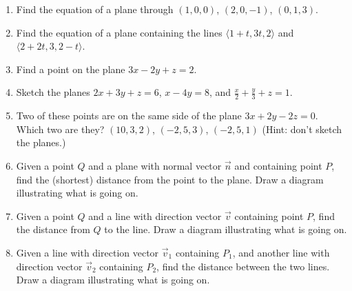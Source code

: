\documentclass[12pt]{article}
\begin{document}
\begin{enumerate}
\item Find the equation of a plane through $(1,0,0)$, $(2,0,-1)$, $(0,1,3)$.
\item Find the equation of a plane containing the lines $\langle 1+t, 3t, 2\rangle$ and $\langle 2+2t, 3, 2-t\rangle$.
\item Find a point on the plane $3x-2y+z=2$.
\item Sketch the planes $2x+3y+z=6$, $x-4y=8$, and $\frac{x}{2}+\frac{y}{3}+z=1$.
\item Two of these points are on the same side of the plane $3x+2y-2z=0$.  Which two are they?  $(10,3,2)$, $(-2,5,3)$, $(-2,5,1)$ (Hint: don't sketch the planes.)
\item Given a point $Q$ and a plane with normal vector $\vec n$ and containing point $P$, find the (shortest) distance from the point to the plane.  Draw a diagram illustrating what is going on.
\item Given a point $Q$ and a line with direction vector $\vec v$ containing point $P$, find the distance from $Q$ to the line.  Draw a diagram illustrating what is going on.
\item Given a line with direction vector $\vec v_1$ containing $P_1$, and another line with direction vector $\vec v_2$ containing $P_2$, find the distance between the two lines. Draw a diagram illustrating what is going on.
\end{enumerate}
\end{document}
